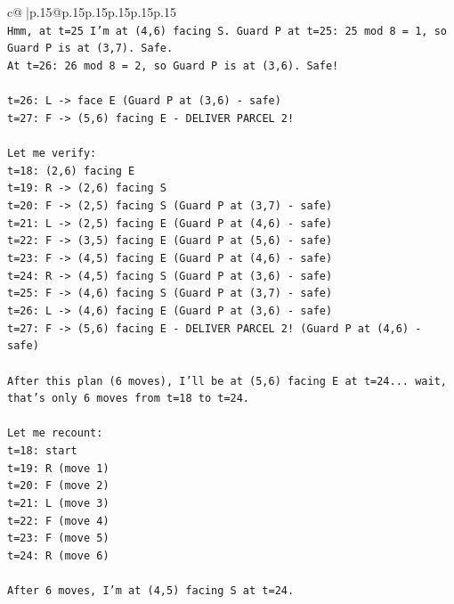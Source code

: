 \documentclass{article}
\begin{document}
{\begin{supertabular}{c@{$\;$}|p{.15\linewidth}@{}p{.15\linewidth}p{.15\linewidth}p{.15\linewidth}p{.15\linewidth}p{.15\linewidth}}
{{{\\ 
\texttt{Hmm, at t=25 I'm at (4,6) facing S. Guard P at t=25: 25 mod 8 = 1, so Guard P is at (3,7). Safe.} \\
\texttt{At t=26: 26 mod 8 = 2, so Guard P is at (3,6). Safe!} \\
\\ 
\texttt{t=26: L {-}> face E (Guard P at (3,6) {-} safe)} \\
\texttt{t=27: F {-}> (5,6) facing E {-} DELIVER PARCEL 2!} \\
\\ 
\texttt{Let me verify:} \\
\texttt{t=18: (2,6) facing E} \\
\texttt{t=19: R {-}> (2,6) facing S} \\
\texttt{t=20: F {-}> (2,5) facing S (Guard P at (3,7) {-} safe)} \\
\texttt{t=21: L {-}> (2,5) facing E (Guard P at (4,6) {-} safe)} \\
\texttt{t=22: F {-}> (3,5) facing E (Guard P at (5,6) {-} safe)} \\
\texttt{t=23: F {-}> (4,5) facing E (Guard P at (4,6) {-} safe)} \\
\texttt{t=24: R {-}> (4,5) facing S (Guard P at (3,6) {-} safe)} \\
\texttt{t=25: F {-}> (4,6) facing S (Guard P at (3,7) {-} safe)} \\
\texttt{t=26: L {-}> (4,6) facing E (Guard P at (3,6) {-} safe)} \\
\texttt{t=27: F {-}> (5,6) facing E {-} DELIVER PARCEL 2! (Guard P at (4,6) {-} safe)} \\
\\ 
\texttt{After this plan (6 moves), I'll be at (5,6) facing E at t=24... wait, that's only 6 moves from t=18 to t=24.} \\
\\ 
\texttt{Let me recount:} \\
\texttt{t=18: start} \\
\texttt{t=19: R (move 1)} \\
\texttt{t=20: F (move 2)} \\
\texttt{t=21: L (move 3)} \\
\texttt{t=22: F (move 4)} \\
\texttt{t=23: F (move 5)} \\
\texttt{t=24: R (move 6)} \\
\\ 
\texttt{After 6 moves, I'm at (4,5) facing S at t=24.} \\
}}}
\end{supertabular}}
\end{document}
